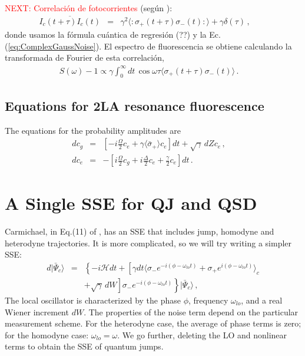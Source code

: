 \documentclass[twocolumn,aps,eqsecnum,showkeys,amsmath]{revtex4}
\newcommand{\mcH}{\mathcal{H}} 	%
\providecommand{\vxp}[1]{\langle #1 \rangle}
\providecommand{\ket}[1]{\lvert #1 \rangle}
\begin{document}
\textcolor{red}{NEXT: Correlaci\'on de  fotocorrientes} (seg\'un \cite{WiMi93b}): 
%
\begin{eqnarray} 	 \label{HomodyneAutoCorr}
\overline{ I_c(t+\tau) I_c(t) } &=& \gamma^2 
	\langle : \sigma_+ (t+\tau) \sigma_- (t) : \rangle 
	+\gamma \delta (\tau) \,, \qquad
\end{eqnarray}
donde usamos la f\'ormula cu\'antica de regresi\'on (??) y la 
Ec.(\ref{eq:ComplexGaussNoise}). El espectro de fluorescencia se 
obtiene calculando la transformada de Fourier de esta correlaci\'on, 
%
\begin{eqnarray} 	 \label{SpectrumHom}
S(\omega)-1 \propto \gamma \int_0^{\infty} dt\, \cos{\omega \tau} 
	\langle  \sigma_+ (t+\tau) \sigma_- (t)  \rangle \,. \quad
\end{eqnarray}

\subsection{Equations for 2LA resonance fluorescence} %
The equations for the probability amplitudes are 
%
\begin{subequations}
\label{eq:HeterodyneSSEamp}
\begin{eqnarray}
dc_g &=& \left[  -i\frac{\Omega}{2} c_e  
	+\gamma \vxp{\bar{\sigma}_+} c_e \right] dt  
	+\sqrt{\gamma} \, dZ c_e \,, 	\quad \\
dc_e &=& -\left[ i\frac{\Omega}{2} c_g 
 	+i\frac{\Delta}{2} c_e +\frac{\gamma}{2} c_e \right] dt \,.
\end{eqnarray}
\end{subequations}


\section{A Single SSE for QJ and QSD}
Carmichael, in Eq.(11) of \cite{Carmichael96}, has an SSE that includes 
jump, homodyne and heterodyne trajectories. It is more complicated, so 
we will try writing a simpler SSE: 
%
\begin{eqnarray} 	\label{GeneralSSE} 
d \ket{\bar{\Psi}_c } &=& \left\{ -i\mcH dt +\left[ 
	\gamma dt  \vxp{ \sigma_- e^{-i(\phi -\omega_{lo}t)} 
  	+\sigma_+ e^{i(\phi -\omega_{lo}t)} }_c \right. \right. 
		\nonumber 	\\
&& \left. \left. +\sqrt{\gamma} \, dW \right] 
	\sigma_- e^{-i(\phi-\omega_{lo}t)} 	\right\}   \ket{\bar{\Psi}_c} 	\,,	
\end{eqnarray}
The local oscillator is characterized by the phase $\phi$, frequency 
$\omega_{lo}$, and a real Wiener increment $dW$. The properties of 
the noise term depend on the particular measurement scheme. For the 
heterodyne case, the average of phase terms is zero; for the homodyne 
case: $\omega_{lo} = \omega$. We go further, deleting the LO and 
nonlinear terms to obtain the SSE of quantum jumps. 
\end{document}
